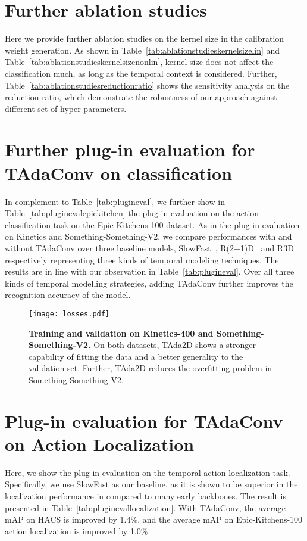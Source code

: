 \documentclass{article} \usepackage{iclr2022_conference,times}
\begin{document}
\section{Further ablation studies}
\label{appendix:ablation}
Here we provide further ablation studies on the kernel size in the calibration weight generation. As shown in Table~\ref{tab:ablationstudieskernelsizelin} and Table~\ref{tab:ablationstudieskernelsizenonlin}, kernel size does not affect the classification much, as long as the temporal context is considered. Further, Table~\ref{tab:ablationstudiesreductionratio} shows the sensitivity analysis on the reduction ratio, which demonstrate the robustness of our approach against different set of hyper-parameters. 


\section{Further plug-in evaluation for TAdaConv on classification}
\label{appendix:pluginclassification}

In complement to Table~\ref{tab:plugineval}, we further show in Table~\ref{tab:pluginevalepickitchen} the plug-in evaluation on the action classification task on the Epic-Kitchens-100 dataset.
As in the plug-in evaluation on Kinetics and Something-Something-V2, we compare performances with and without TAdaConv over three baseline models, SlowFast~\citep{slowfast}, R(2+1)D~\citep{r21d} and R3D~\citep{retrace} respectively representing three kinds of temporal modeling techniques. 
The results are in line with our observation in Table~\ref{tab:plugineval}. Over all three kinds of temporal modelling strategies, adding TAdaConv further improves the recognition accuracy of the model.
\begin{figure}[t]
\centering
\texttt{[image: losses.pdf]}
\caption{\textbf{Training and validation on Kinetics-400 and Something-Something-V2.} On both datasets, TAda2D shows a stronger capability of fitting the data and a better generality to the validation set. Further, TAda2D reduces the overfitting problem in Something-Something-V2.}
\label{fig:losses}
\end{figure}
\section{Plug-in evaluation for TAdaConv on Action Localization}
\label{appendix:pluginlocalization}
Here, we show the plug-in evaluation on the temporal action localization task. 
Specifically, we use SlowFast as our baseline, as it is shown to be superior in the localization performance in \citet{tcanet} compared to many early backbones.
The result is presented in Table~\ref{tab:pluginevallocalization}. 
With TAdaConv, the average mAP on HACS is improved by 1.4\%, and the average mAP on Epic-Kitchens-100 action localization is improved by 1.0\%. 
\end{document}
